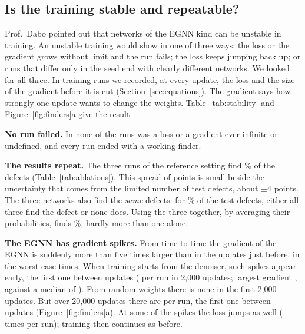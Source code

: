\subsection{Is the training stable and repeatable?}
\label{sec:stability}



Prof.\ Dabo pointed out that networks of the EGNN kind can be unstable in training. An unstable training would show in one of three ways: the loss or the gradient grows without limit and the run fails; the loss keeps jumping back up; or runs that differ only in the seed end with clearly different networks. We looked for all three. In  training runs we recorded, at every update, the loss and the size of the gradient before it is cut (Section~\ref{sec:equations}). The gradient says how strongly one update wants to change the weights. Table~\ref{tab:stability} and Figure~\ref{fig:finders}a give the result.

\textbf{No run failed.} In none of the  runs was a loss or a gradient ever infinite or undefined, and every run ended with a working finder.

\textbf{The results repeat.} The three runs of the reference setting find \% of the defects (Table~\ref{tab:ablations}). This spread of  points is small beside the uncertainty that comes from the limited number of test defects, about $\pm4$ points. The three networks also find the \emph{same} defects: for \% of the test defects, either all three find the defect or none does. Using the three together, by averaging their probabilities, finds \%, hardly more than one alone.

\textbf{The EGNN has gradient spikes.} From time to time the gradient of the EGNN is suddenly more than five times larger than in the updates just before, in the worst case  times. When training starts from the denoiser, such spikes appear early, the first one between updates  ( per run in 2,000 updates; largest gradient , against a median of ). From random weights there is none in the first 2,000 updates. But over 20,000 updates there are  per run, the first one between updates  (Figure~\ref{fig:finders}a). At some of the spikes the loss jumps as well ( times per run); training then continues as before.

